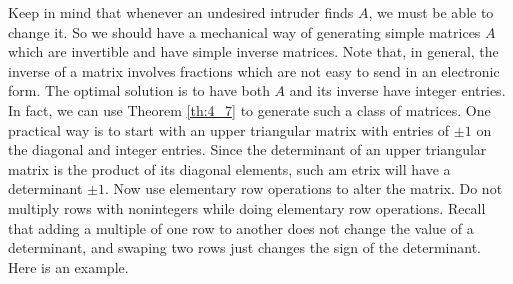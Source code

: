 \documentclass[../main.tex]{subfiles}
\begin{document}
Keep in mind that whenever an undesired intruder finds \(A\), we must be able to change it. So we should have a mechanical way of generating simple matrices \(A\) which are invertible and have simple inverse matrices. Note that, in general, the inverse of a matrix involves fractions which are not easy to send in an electronic form. The optimal solution is to have both \(A\) and its inverse have integer entries. In fact, we can use Theorem \ref{th:4_7} to generate such a class of matrices. One practical way is to start with an upper triangular matrix with entries of \(\pm1\) on the diagonal and integer entries. Since the determinant of an upper triangular matrix is the product of its diagonal elements, such am etrix will have a determinant \(\pm1\). Now use elementary row operations to alter the matrix. Do not multiply rows with nonintegers while doing elementary row operations. Recall that adding a multiple of one row to another does not change the value of a determinant, and swaping two rows just changes the sign of the determinant. Here is an example.
\end{document}
